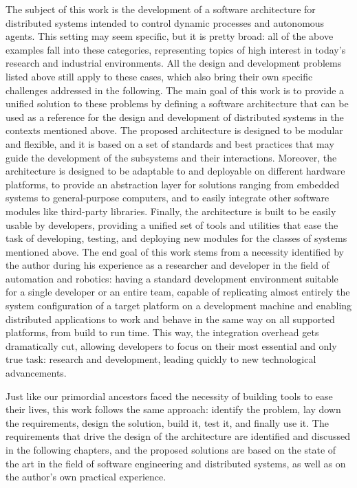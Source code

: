 The subject of this work is the development of a software architecture for distributed systems intended to control dynamic processes and autonomous agents. This setting may seem specific, but it is pretty broad: all of the above examples fall into these categories, representing topics of high interest in today's research and industrial environments. All the design and development problems listed above still apply to these cases, which also bring their own specific challenges addressed in the following. The main goal of this work is to provide a unified solution to these problems by defining a software architecture that can be used as a reference for the design and development of distributed systems in the contexts mentioned above. The proposed architecture is designed to be modular and flexible, and it is based on a set of standards and best practices that may guide the development of the subsystems and their interactions. Moreover, the architecture is designed to be adaptable to and deployable on different hardware platforms, to provide an abstraction layer for solutions ranging from embedded systems to general-purpose computers, and to easily integrate other software modules like third-party libraries. Finally, the architecture is built to be easily usable by developers, providing a unified set of tools and utilities that ease the task of developing, testing, and deploying new modules for the classes of systems mentioned above. The end goal of this work stems from a necessity identified by the author during his experience as a researcher and developer in the field of automation and robotics: having a standard development environment suitable for a single developer or an entire team, capable of replicating almost entirely the system configuration of a target platform on a development machine and enabling distributed applications to work and behave in the same way on all supported platforms, from build to run time. This way, the integration overhead gets dramatically cut, allowing developers to focus on their most essential and only true task: research and development, leading quickly to new technological advancements.

Just like our primordial ancestors faced the necessity of building tools to ease their lives, this work follows the same approach: identify the problem, lay down the requirements, design the solution, build it, test it, and finally use it. The requirements that drive the design of the architecture are identified and discussed in the following chapters, and the proposed solutions are based on the state of the art in the field of software engineering and distributed systems, as well as on the author's own practical experience.
